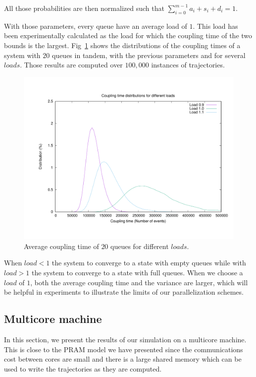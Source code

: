 \documentclass[a4paper,10pt]{article}
\begin{document}
All those probabilities are then normalized such that $\sum\limits_{i=0}^{m-1} a_i + s_i + d_i = 1$.

With those parameters, every queue have an average load of $1$. This load has been experimentally calculated as the load for which the coupling time of the two bounds is the largest. Fig~\ref{fig:distribs} shows the distributions of the coupling times of a system with $20$ queues in tandem, with the previous parameters and for several $loads$. Those results are computed over $100,000$ instances of trajectories. 

\begin{figure}[!h]
\centering
 \includegraphics[scale=0.3]{distribs.pdf}
 \caption{Average coupling time of $20$ queues for different $loads$.}\label{fig:distribs}
\end{figure}
When $load < 1$ the system to converge to a state with empty queues while with $load > 1$ the system to converge to a state with full queues. When we choose a $load$ of $1$, both the average coupling time and the variance are larger, which will be helpful in experiments to illustrate the limits of our parallelization schemes.

\subsection{Multicore machine}

In this section, we present the results of our simulation on a multicore machine.
This is close to the PRAM model we have presented since the communications cost between cores
are small and there is a large shared memory which can be used to write the trajectories as they are computed.
\end{document}
